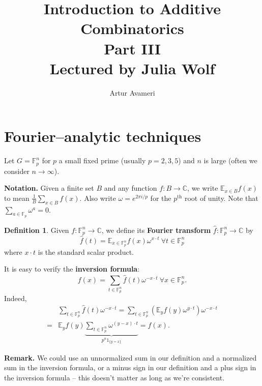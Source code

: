 \documentclass{article}
\title{Introduction to Additive Combinatorics \\ Part III
    \\ \large
    Lectured by Julia Wolf
}
\author{Artur Avameri}
\date{}
\theoremstyle{definition}
\newtheorem{defn}[theorem]{Definition}
\begin{document}
\maketitle
\tableofcontents
\newpage
 
\section{Fourier--analytic techniques}



Let $G = \mathbb{F}_{p}^n$ for $p$ a small fixed prime (usually $p = 2,3,5$) and $n$ is large (often we consider $n \to \infty$).
\vspace{1mm}
 
\textbf{Notation.} Given a finite set $B$ and any function $f : B \to \mathbb{C}$, we write $\mathbb{E}_{x \in B}f(x)$ to mean $\frac{1}{B}\sum_{x \in B} f(x)$. Also write $\omega = e^{2\pi i /p}$ for the $p^{\text{th}}$ root of unity. Note that $\sum_{a \in \mathbb{F}_p}^{} \omega^a = 0$.

\begin{defn}
    Given $f : \mathbb{F}_{p}^n \to \mathbb{C}$, we define its \textbf{Fourier transform} ${\hat{f} : \mathbb{F}_{p}^n \to \mathbb{C}}$ by \[
    \hat{f}(t) = \mathbb{E}_{x \in \mathbb{F}_{p}^n} f(x)\omega^{x \cdot t} ~\forall  t \in \mathbb{F}_{p}^n
    \] 
    where $x \cdot t$ is the standard scalar product.
\end{defn}
It is easy to verify the \textbf{inversion formula}:
\[
f(x) = \sum_{t \in \mathbb{F}_{p}^n}^{} \hat{f}(t) \omega^{-x \cdot t} ~\forall  x \in \mathbb{F}_{p}^n.
\]
Indeed, 
\begin{align*}
    &\sum_{t \in \mathbb{F}_{p}^n}^{} \hat{f}(t) \omega^{-x \cdot t} = \sum_{t \in \mathbb{F}_{p}^n}^{} \left(\mathbb{E}_y f(y) \omega^{y \cdot t} \right)\omega^{-x \cdot t}\\
    =& \mathbb{E}_y f(y) \underbrace{\sum_{t \in \mathbb{F}_{p}^n}^{} \omega^{(y-x)\cdot t}}_{p^n 1_{\{y=x\}}} = f(x).
\end{align*}

\textbf{Remark.} We could use an unnormalized sum in our definition and a normalized sum in the inversion formula, or a minus sign in our definition and a plus sign in the inversion formula -- this doesn't matter as long as we're consistent.

\vspace{1mm}
 
\end{document}
